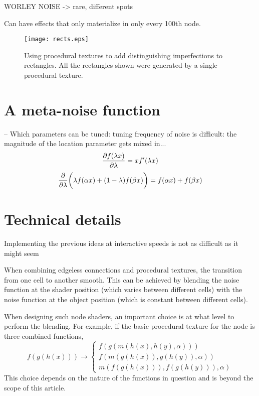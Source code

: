 \documentclass[twocolumn]{IV02}
\begin{document}
WORLEY NOISE -> rare, different spots

Can have effects that only materialize in only every 100th node.
\cite{more-is-different}


\begin{figure*}
\centering
\texttt{[image: rects.eps]}
\caption{
\label{fig-proctext}
Using procedural textures to add distinguishing imperfections to 
rectangles. 
All the rectangles shown were generated by a single procedural
texture. 
}
\end{figure*}

\section{A meta-noise function}

-- Which parameters can be tuned: tuning frequency of noise is difficult:
  the magnitude of the location parameter gets mixed in...
$$
    { \partial f(\lambda x) \over \partial \lambda } 
	= x f'(\lambda x)
$$
$$
    { \partial \over \partial \lambda }
\biggl(	\lambda f(\alpha x) + (1-\lambda) f(\beta x) \biggr)
	= f(\alpha x) + f(\beta x)
$$


\section{Technical details}

\label{sec-basicimpl}

Implementing the previous ideas at interactive speeds is not
as difficult as it might seem

When combining edgeless connections and procedural textures, the 
transition from one cell to another smooth. This can be achieved by 
blending the noise function at the shader position (which varies between
different cells) with the noise function at the object position 
(which is constant between different cells).

When designing such node shaders, an important choice is at what level
to perform the blending. For example, if the basic procedural texture
for the node is three combined functions,
$$
f(g(h(x))) \rightarrow \left\{
\begin{array}{l}
f(g(m(h(x), h(y), \alpha))) \\
f(m(g(h(x)), g(h(y)), \alpha)) \\
m(f(g(h(x))), f(g(h(y))), \alpha) 
\end{array}
\right.
$$
This choice depends on the nature of the functions in question
and is beyond the scope of this article.
\end{document}
